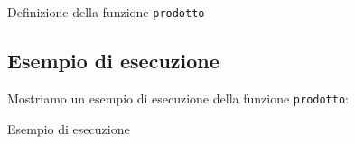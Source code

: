 \begin{listing}[!h]
\caption[Funzione \texttt{prodotto}]{Definizione della funzione \texttt{prodotto}}
\end{listing}

\subsection*{Esempio di esecuzione}

Mostriamo un esempio di esecuzione della funzione \texttt{prodotto}:

\begin{listing}[!h]
\caption[Esempio di esecuzione]{Esempio di esecuzione}
\end{listing}
